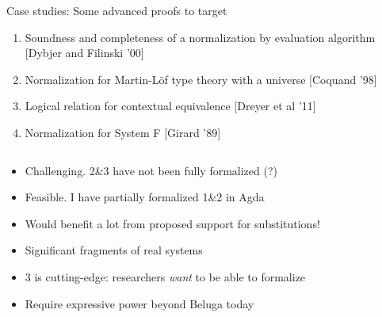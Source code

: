 \documentclass[usenames,dvipsnames]{beamer}
\begin{document}
\begin{frame}{Case studies: Some advanced proofs to target}
\begin{enumerate}
\item Soundness and completeness of a normalization by evaluation algorithm [Dybjer and Filinski '00]
\item Normalization for Martin-L\"of type theory with a universe [Coquand '98]
\item Logical relation for contextual equivalence [Dreyer et al '11]
\item Normalization for System F [Girard '89]
\end{enumerate}

$\,$

\begin{itemize}
\item Challenging. 2\&{}3 have not been fully formalized (?)
\item Feasible. I have partially formalized 1\&{}2 in Agda
\item Would benefit a lot from proposed support for substitutions!
\item Significant fragments of real systems
\item 3 is cutting-edge: researchers \emph{want} to be able to formalize
\item Require expressive power beyond Beluga today
\end{itemize}
\end{frame}

\end{document}
